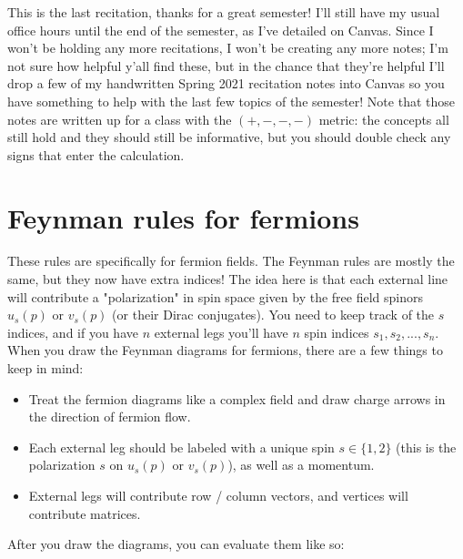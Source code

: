 \documentclass[12pt, oneside]{article}   	%
\theoremstyle{definition}
\begin{document}

%


This is the last recitation, thanks for a great semester! I'll still have my usual office hours until the end of the semester, as I've detailed on Canvas. Since I won't be holding any more recitations, I won't be creating any more notes; I'm not sure how helpful y'all find these, but in the chance that they're helpful I'll drop a few of my handwritten Spring 2021 recitation notes into Canvas so you have something to help with the last few topics of the semester! Note that those notes are written up for a class with the $(+, -, -, -)$ metric: the concepts all still hold and they should still be informative, but you should double check any signs that enter the calculation. 

\section*{Feynman rules for fermions}

These rules are specifically for fermion fields. The Feynman rules are mostly the same, but they now have extra indices! The idea here is that each external line will contribute a "polarization" in spin space given by the free field spinors $u_s(p)$ or $v_s(p)$ (or their Dirac conjugates). You need to keep track of the $s$ indices, and if you have $n$ external legs you'll have $n$ spin indices $s_1, s_2, ..., s_n$. When you draw the Feynman diagrams for fermions, there are a few things to keep in mind:
	\begin{itemize}
		\item Treat the fermion diagrams like a complex field and draw charge arrows in the direction of fermion flow. 
		\item Each external leg should be labeled with a unique spin $s\in \{1, 2\}$ (this is the polarization $s$ on $u_s(p)$ or $v_s(p)$), as well as a momentum. 
		\item External legs will contribute row / column vectors, and vertices will contribute matrices. 
	\end{itemize}
	
	After you draw the diagrams, you can evaluate them like so:
	
\end{document}
